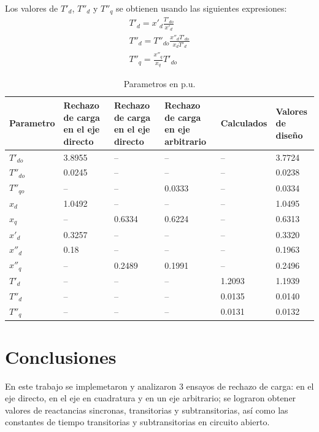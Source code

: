 \documentclass[conference]{IEEEtran}
\begin{document}
Los valores de $T'_d$, $T''_d$ y $T''_q$ se obtienen usando las siguientes expresiones:
\begin{gather}
    T'_d = x'_d\frac{T'_{do}}{x'_d}\\
    T''_d = T''_{do}\frac{x''_d T'_{do}}{x_d T'_d} \\
    T''_q = \frac{x''_q}{x_q}  T'_{do}
\end{gather}

\setlength{\extrarowheight}{2pt} %
\begin{table}[ht]
\centering
\caption{Parametros en p.u.}
\setlength{\tabcolsep}{6pt}
\begin{tabular}{C{1cm} C{1cm} C{1cm} C{1cm} C{1cm} C{1.25cm}}
\toprule
\textbf{Parametro} &
\textbf{Rechazo de carga en el eje directo} &
\textbf{Rechazo de carga en el eje directo} &
\textbf{Rechazo de carga en eje arbitrario} &
\textbf{Calculados} & 
\textbf{Valores de diseño} \\
\hline
\midrule
$T'_{do}$ & 3.8955 & --     & --     & --     & 3.7724 \\
$T''_{do}$ & 0.0245 & --     & --     & --     & 0.0238 \\
$T''_{qo}$ & --     & --     & 0.0333 & --     & 0.0334 \\
$x_d$ & 1.0492 & --     & --     & --     & 1.0495 \\
$x_q$ & --     & 0.6334 & 0.6224 & --     & 0.6313 \\
$x'_d$ & 0.3257 & --     & --     & --     & 0.3320 \\
$x''_d$ & 0.18 & --     & --     & --     & 0.1963 \\
$x''_q$ & --     & 0.2489 & 0.1991 & --     & 0.2496 \\
$T'_d$ & --     & --     & --     & 1.2093 & 1.1939 \\
$T''_d$ & --     & --     & --     & 0.0135 & 0.0140 \\
$T''_q$ & --     & --     & --     & 0.0131 & 0.0132 \\
\bottomrule
\end{tabular}
\label{tab:result}
\end{table}


\section{Conclusiones}
En este trabajo se implemetaron y analizaron 3 ensayos de rechazo de carga: en el eje directo, en el eje en cuadratura y en un eje arbitrario;
se lograron obtener valores de reactancias sincronas, transitorias y subtransitorias, así como las constantes de tiempo transitorias y subtransitorias en circuito abierto.
\end{document}
